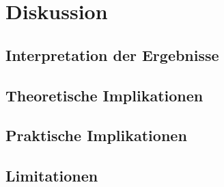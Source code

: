 \chapter{Diskussion}\label{chap:diskussion}

\section{Interpretation der Ergebnisse}\label{sec:interpretation}

\section{Theoretische Implikationen}\label{sec:theorie-implikationen}

\section{Praktische Implikationen}\label{sec:praxis-implikationen}

\section{Limitationen}\label{sec:limitationen}
